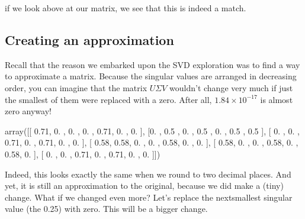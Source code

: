 \documentclass[letterpaper,10pt,english]{jupyterBook}
\begin{document}
\sphinxAtStartPar
if we look above at our  matrix, we see that this is indeed a match.


\subsection{Creating an approximation}
\label{\detokenize{chapter-16-matrices:creating-an-approximation}}
\sphinxAtStartPar
Recall that the reason we embarked upon the SVD exploration was to find a way to approximate a matrix.  Because the singular values are arranged in decreasing order, you can imagine that the matrix \(U\Sigma V\) wouldn’t change very much if just the smallest of them were replaced with a zero.  After all, \(1.84\times10^{-17}\) is almost zero anyway!

\begin{sphinxVerbatim}[commandchars=\\\{\}]
    
\PYG{p}{[}\PYG{p}{]}  
     
   
       
\end{sphinxVerbatim}

\begin{sphinxVerbatim}[commandchars=\\\{\}]
array([[ 0.71, \PYGZhy{}0.  ,  0.  ,  0.  ,  0.71, \PYGZhy{}0.  , \PYGZhy{}0.  ],
       [\PYGZhy{}0.  ,  0.5 , \PYGZhy{}0.  ,  0.5 ,  0.  ,  0.5 ,  0.5 ],
       [ 0.  , \PYGZhy{}0.  ,  0.71, \PYGZhy{}0.  ,  0.71,  0.  , \PYGZhy{}0.  ],
       [ 0.58,  0.58, \PYGZhy{}0.  ,  0.  ,  0.58, \PYGZhy{}0.  ,  0.  ],
       [ 0.58, \PYGZhy{}0.  , \PYGZhy{}0.  ,  0.58, \PYGZhy{}0.  ,  0.58,  0.  ],
       [ 0.  , \PYGZhy{}0.  ,  0.71, \PYGZhy{}0.  ,  0.71, \PYGZhy{}0.  , \PYGZhy{}0.  ]])
\end{sphinxVerbatim}

\sphinxAtStartPar
Indeed, this looks exactly the same when we round to two decimal places.  And yet, it is still an approximation to the original, because we did make a (tiny) change.  What if we changed even more?  Let’s replace the next\sphinxhyphen{}smallest singular value (the 0.25) with zero.  This will be a bigger change.
\end{document}
